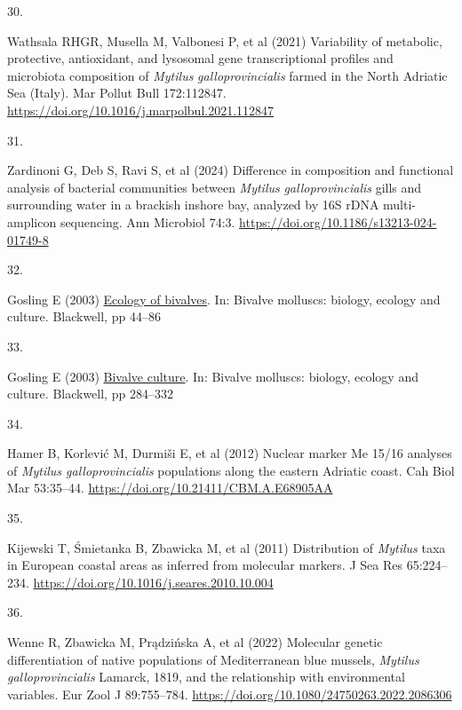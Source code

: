 \documentclass[
  12 pt,
]{article}
\newlength{\cslhangindent}
\newlength{\csllabelwidth}
\newenvironment{CSLReferences}[2] %
 {\begin{list}{}{%
  \setlength{\itemindent}{0pt}
  \setlength{\leftmargin}{0pt}
  \setlength{\parsep}{0pt}
  \ifodd #1
   \setlength{\leftmargin}{\cslhangindent}
   \setlength{\itemindent}{-1\cslhangindent}
  \fi
  \setlength{\itemsep}{#2\baselineskip}}}
 {\end{list}}
\newcommand{\CSLLeftMargin}[1]{\parbox[t]{\csllabelwidth}{\strut#1\strut}}
\newcommand{\CSLRightInline}[1]{\parbox[t]{\linewidth - \csllabelwidth}{\strut#1\strut}}
\begin{document}
\begin{CSLReferences}{0}{0}
\CSLLeftMargin{30. }%
\CSLRightInline{Wathsala RHGR, Musella M, Valbonesi P, et al (2021) Variability of metabolic, protective, antioxidant, and lysosomal gene transcriptional profiles and microbiota composition of {{\emph{Mytilus}}}{{\emph{ galloprovincialis}}} farmed in the {North Adriatic Sea} ({Italy}). Mar Pollut Bull 172:112847. \url{https://doi.org/10.1016/j.marpolbul.2021.112847}}

\CSLLeftMargin{31. }%
\CSLRightInline{Zardinoni G, Deb S, Ravi S, et al (2024) Difference in composition and functional analysis of bacterial communities between {{\emph{Mytilus}}}{{\emph{ galloprovincialis}}} gills and surrounding water in a brackish inshore bay, analyzed by {16S rDNA} multi-amplicon sequencing. Ann Microbiol 74:3. \url{https://doi.org/10.1186/s13213-024-01749-8}}

\CSLLeftMargin{32. }%
\CSLRightInline{Gosling E (2003) \href{https://doi.org/10.1002/9780470995532.ch3}{Ecology of bivalves}. In: Bivalve molluscs: biology, ecology and culture. Blackwell, pp 44--86}

\CSLLeftMargin{33. }%
\CSLRightInline{Gosling E (2003) \href{https://doi.org/10.1002/9780470995532.ch9}{Bivalve culture}. In: Bivalve molluscs: biology, ecology and culture. Blackwell, pp 284--332}

\CSLLeftMargin{34. }%
\CSLRightInline{Hamer B, Korlević M, Durmiši E, et al (2012) Nuclear marker {Me} 15/16 analyses of {{\emph{Mytilus galloprovincialis}}} populations along the eastern {Adriatic} coast. Cah Biol Mar 53:35--44. \url{https://doi.org/10.21411/CBM.A.E68905AA}}

\CSLLeftMargin{35. }%
\CSLRightInline{Kijewski T, Śmietanka B, Zbawicka M, et al (2011) Distribution of {{\emph{Mytilus}}} taxa in {European} coastal areas as inferred from molecular markers. J Sea Res 65:224--234. \url{https://doi.org/10.1016/j.seares.2010.10.004}}

\CSLLeftMargin{36. }%
\CSLRightInline{Wenne R, Zbawicka M, Prądzińska A, et al (2022) Molecular genetic differentiation of native populations of {Mediterranean} blue mussels, {{\emph{Mytilus galloprovincialis}}} {Lamarck}, 1819, and the relationship with environmental variables. Eur Zool J 89:755--784. \url{https://doi.org/10.1080/24750263.2022.2086306}}


\end{CSLReferences}
\end{document}

